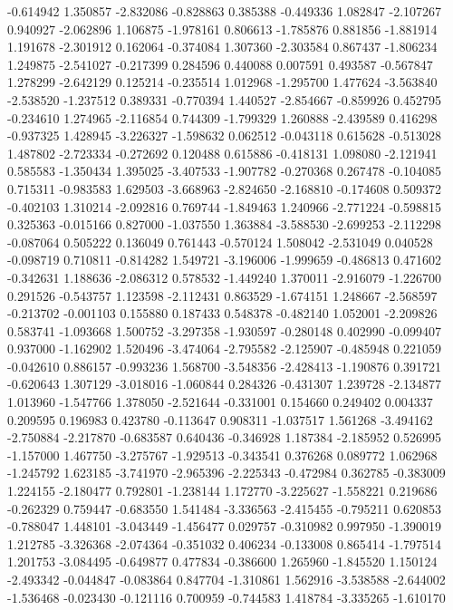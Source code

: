 -0.614942
1.350857
-2.832086
-0.828863
0.385388
-0.449336
1.082847
-2.107267
0.940927
-2.062896
1.106875
-1.978161
0.806613
-1.785876
0.881856
-1.881914
1.191678
-2.301912
0.162064
-0.374084
1.307360
-2.303584
0.867437
-1.806234
1.249875
-2.541027
-0.217399
0.284596
0.440088
0.007591
0.493587
-0.567847
1.278299
-2.642129
0.125214
-0.235514
1.012968
-1.295700
1.477624
-3.563840
-2.538520
-1.237512
0.389331
-0.770394
1.440527
-2.854667
-0.859926
0.452795
-0.234610
1.274965
-2.116854
0.744309
-1.799329
1.260888
-2.439589
0.416298
-0.937325
1.428945
-3.226327
-1.598632
0.062512
-0.043118
0.615628
-0.513028
1.487802
-2.723334
-0.272692
0.120488
0.615886
-0.418131
1.098080
-2.121941
0.585583
-1.350434
1.395025
-3.407533
-1.907782
-0.270368
0.267478
-0.104085
0.715311
-0.983583
1.629503
-3.668963
-2.824650
-2.168810
-0.174608
0.509372
-0.402103
1.310214
-2.092816
0.769744
-1.849463
1.240966
-2.771224
-0.598815
0.325363
-0.015166
0.827000
-1.037550
1.363884
-3.588530
-2.699253
-2.112298
-0.087064
0.505222
0.136049
0.761443
-0.570124
1.508042
-2.531049
0.040528
-0.098719
0.710811
-0.814282
1.549721
-3.196006
-1.999659
-0.486813
0.471602
-0.342631
1.188636
-2.086312
0.578532
-1.449240
1.370011
-2.916079
-1.226700
0.291526
-0.543757
1.123598
-2.112431
0.863529
-1.674151
1.248667
-2.568597
-0.213702
-0.001103
0.155880
0.187433
0.548378
-0.482140
1.052001
-2.209826
0.583741
-1.093668
1.500752
-3.297358
-1.930597
-0.280148
0.402990
-0.099407
0.937000
-1.162902
1.520496
-3.474064
-2.795582
-2.125907
-0.485948
0.221059
-0.042610
0.886157
-0.993236
1.568700
-3.548356
-2.428413
-1.190876
0.391721
-0.620643
1.307129
-3.018016
-1.060844
0.284326
-0.431307
1.239728
-2.134877
1.013960
-1.547766
1.378050
-2.521644
-0.331001
0.154660
0.249402
0.004337
0.209595
0.196983
0.423780
-0.113647
0.908311
-1.037517
1.561268
-3.494162
-2.750884
-2.217870
-0.683587
0.640436
-0.346928
1.187384
-2.185952
0.526995
-1.157000
1.467750
-3.275767
-1.929513
-0.343541
0.376268
0.089772
1.062968
-1.245792
1.623185
-3.741970
-2.965396
-2.225343
-0.472984
0.362785
-0.383009
1.224155
-2.180477
0.792801
-1.238144
1.172770
-3.225627
-1.558221
0.219686
-0.262329
0.759447
-0.683550
1.541484
-3.336563
-2.415455
-0.795211
0.620853
-0.788047
1.448101
-3.043449
-1.456477
0.029757
-0.310982
0.997950
-1.390019
1.212785
-3.326368
-2.074364
-0.351032
0.406234
-0.133008
0.865414
-1.797514
1.201753
-3.084495
-0.649877
0.477834
-0.386600
1.265960
-1.845520
1.150124
-2.493342
-0.044847
-0.083864
0.847704
-1.310861
1.562916
-3.538588
-2.644002
-1.536468
-0.023430
-0.121116
0.700959
-0.744583
1.418784
-3.335265
-1.610170

